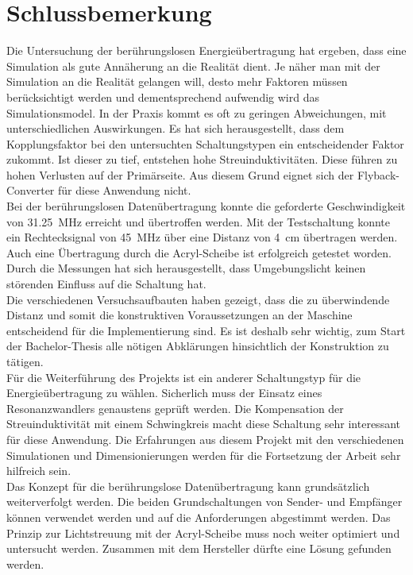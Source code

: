 \section{Schlussbemerkung}
\label{sec:Schlussbemerkung}

Die Untersuchung der berührungslosen Energieübertragung hat ergeben, dass eine Simulation als gute Annäherung an die Realität dient. Je näher man mit der Simulation an die Realität gelangen will, desto mehr Faktoren müssen berücksichtigt werden und dementsprechend aufwendig wird das Simulationsmodel. In der Praxis kommt es oft zu geringen Abweichungen, mit unterschiedlichen Auswirkungen. Es hat sich herausgestellt, dass dem Kopplungsfaktor bei den untersuchten Schaltungstypen ein entscheidender Faktor zukommt. Ist dieser zu tief, entstehen hohe Streuinduktivitäten. Diese führen zu hohen Verlusten auf der Primärseite. Aus diesem Grund eignet sich der Flyback-Converter für diese Anwendung nicht.
\newline \\
Bei der berührungslosen Datenübertragung konnte die geforderte Geschwindigkeit von \linebreak \SI{31.25}{MHz} erreicht und übertroffen werden. Mit der Testschaltung konnte ein Rechtecksignal von \SI{45}{MHz} über eine Distanz von \SI{4}{cm} übertragen werden. Auch eine Übertragung durch die Acryl-Scheibe ist erfolgreich getestet worden. Durch die Messungen hat sich herausgestellt, dass Umgebungslicht keinen störenden Einfluss auf die Schaltung hat.
\newline \\
Die verschiedenen Versuchsaufbauten haben gezeigt, dass die zu überwindende Distanz und somit die konstruktiven Voraussetzungen an der Maschine entscheidend für die Implementierung sind. Es ist deshalb sehr wichtig, zum Start der Bachelor-Thesis alle nötigen Abklärungen hinsichtlich der Konstruktion zu tätigen.
\newline \\
Für die Weiterführung des Projekts ist ein anderer Schaltungstyp für die Energieübertragung zu wählen. Sicherlich muss der Einsatz eines Resonanzwandlers genaustens geprüft werden. Die Kompensation der Streuinduktivität mit einem Schwingkreis macht diese Schaltung sehr interessant für diese Anwendung. Die Erfahrungen aus diesem Projekt mit den verschiedenen Simulationen und Dimensionierungen werden für die Fortsetzung der Arbeit sehr hilfreich sein.
\newline \\
Das Konzept für die berührungslose Datenübertragung kann grundsätzlich weiterverfolgt werden. Die beiden Grundschaltungen von Sender- und Empfänger können verwendet werden und auf die Anforderungen abgestimmt werden. Das Prinzip zur Lichtstreuung mit der Acryl-Scheibe muss noch weiter optimiert und untersucht werden. Zusammen mit dem Hersteller dürfte eine Lösung gefunden werden.
